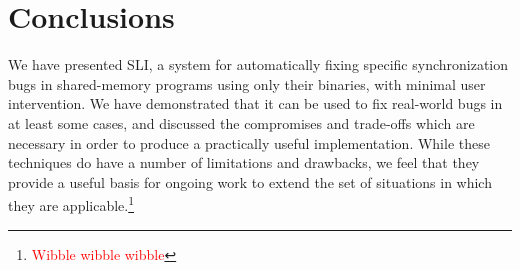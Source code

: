 \documentclass[10pt,twocolumn,preprint,natbib,authoryear]{sigplanconf}
\newcommand{\editorial}[1]{\textcolor{red}{\footnote{\textcolor{red}{#1}}}}
\begin{document}
\section{Conclusions}

We have presented SLI, a system for automatically fixing specific
synchronization bugs in shared-memory programs using only their
binaries, with minimal user intervention.  We have demonstrated that
it can be used to fix real-world bugs in at least some cases, and
discussed the compromises and trade-offs which are necessary in order
to produce a practically useful implementation.  While these
techniques do have a number of limitations and drawbacks, we feel that
they provide a useful basis for ongoing work to extend the set of
situations in which they are applicable.\editorial{Wibble wibble
  wibble}




\end{document}
